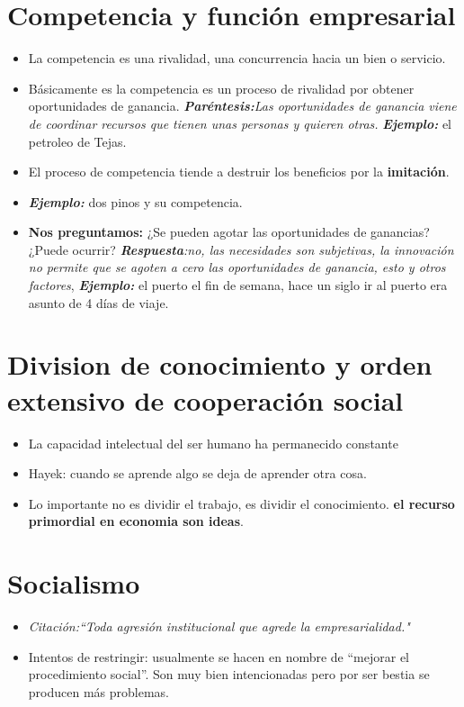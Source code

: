 \section{Competencia y función empresarial}
\begin{itemize}
    \item La competencia es una rivalidad, una concurrencia hacia un bien o servicio.
    \item Básicamente es la competencia es un proceso de rivalidad por obtener oportunidades de ganancia. \emph{\textbf{Paréntesis:}Las oportunidades de ganancia viene de coordinar recursos que tienen unas personas y quieren otras.} \textbf{\emph{Ejemplo:}} el petroleo de Tejas. 
    \item El proceso de competencia tiende a destruir los beneficios por la \textbf{imitación}.
    \item \textbf{\emph{Ejemplo:}} dos pinos y su competencia.
    \item \textbf{Nos preguntamos:} ¿Se pueden agotar las oportunidades de ganancias? ¿Puede ocurrir? \emph{\textbf{Respuesta}:no, las necesidades son subjetivas, la innovación no permite que se agoten a cero las oportunidades de ganancia, esto y otros factores}, \textbf{\emph{Ejemplo:}} el puerto el fin de semana, hace un siglo ir al puerto era asunto de 4 días de viaje. 
\end{itemize}

\section{Division de conocimiento y orden extensivo de cooperación social}
\begin{itemize}
    \item La capacidad intelectual del ser humano ha permanecido constante
    \item Hayek: cuando se aprende algo se deja de aprender otra cosa.
    \item Lo importante no es dividir el trabajo, es dividir el conocimiento. \textbf{el recurso primordial en economia son ideas}.
\end{itemize}


\section{Socialismo}
\begin{itemize}
    \item \emph{Citación:``Toda agresión institucional que agrede la empresarialidad."}
    \item Intentos de restringir: usualmente se hacen en nombre de ``mejorar el procedimiento social''. Son muy bien intencionadas pero por ser bestia se producen más problemas.
\end{itemize}
